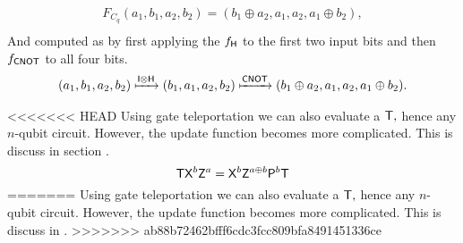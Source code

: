 \begin{equation*}
\begin{aligned}
F_{C_q}(a_1,b_1,a_2,b_2)=(b_1\oplus a_2,a_1,a_2, a_1\oplus b_2),\\
\end{aligned}
\end{equation*}
And computed as by first applying the $f_{\sf H}$ to the first two input bits and then $f_{{\sf CNOT}}$ to all four bits.
\begin{equation*}
\begin{aligned}
(a_1,b_1,a_2,b_2) \xmapsto{{\sf I}\otimes {\sf H}} (b_1,a_1,a_2,b_2)\xmapsto{{\sf CNOT}} (b_1\oplus a_2,a_1,a_2, a_1\oplus b_2).
\end{aligned}
\end{equation*}

\begin{remark}
<<<<<<< HEAD
Using gate teleportation we can also evaluate a  ${\sf T},$  hence any $n$-qubit circuit. However, the update function becomes more complicated. This is discuss in section .
						$${\sf T} {\sf X}^b {\sf Z}^a= {\sf X}^b {\sf Z}^{a\oplus b} {\sf P}^b {\sf T}$$
=======
Using gate teleportation we can also evaluate a  ${\sf T},$  hence any $n$-qubit circuit. However, the update function becomes more complicated. This is discuss in .
>>>>>>> ab88b72462bfff6cdc3fcc809bfa8491451336ce
\end{remark}





			
				




